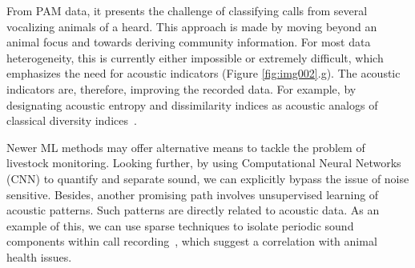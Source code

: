 \hfill


From PAM data, it presents the challenge of classifying calls from several vocalizing animals of a heard.
This approach is made by moving beyond an animal focus and towards deriving community information.
For most data heterogeneity, this is currently either impossible or extremely difficult, which emphasizes the need for acoustic indicators (Figure \ref{fig:img002}.g).
The acoustic indicators are, therefore, improving the recorded data.
For example, by designating acoustic entropy and dissimilarity indices as acoustic analogs of classical diversity indices~\cite{sueur2008rapid}.

Newer ML methods may offer alternative means to tackle the problem of livestock monitoring.
Looking further, by using Computational Neural Networks (CNN) to quantify and separate sound, we can explicitly bypass the issue of noise sensitive.
Besides, another promising path involves unsupervised learning of acoustic patterns.
Such patterns are directly related to acoustic data.
As an example of this, we can use sparse techniques to isolate periodic sound components within call recording~\cite{underwood2002pain}, which suggest a correlation with animal health issues.